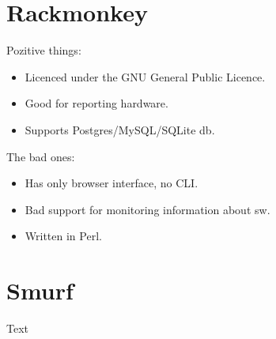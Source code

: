 \documentclass[12pt]{article}
\begin{document}
\section{Rackmonkey}
Pozitive things:
\begin{itemize}
\item Licenced under the GNU General Public Licence.
\item Good for reporting hardware.
\item Supports Postgres/MySQL/SQLite db.
\end{itemize}


The bad ones:
\begin{itemize}
\item Has only browser interface, no CLI.
\item Bad support for monitoring information about sw.
\item Written in Perl.
\end{itemize}



\section{Smurf}
Text
\end{document}
